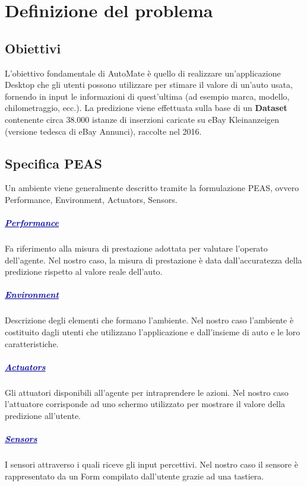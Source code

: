 \chapter{Definizione del problema}
\section{Obiettivi}
L'obiettivo fondamentale di AutoMate è quello di realizzare un'applicazione Desktop che gli utenti possono utilizzare per stimare il valore di un'auto usata, fornendo in input le informazioni di quest'ultima (ad esempio marca, modello, chilometraggio, ecc.). La predizione viene effettuata sulla base di un \textbf{Dataset} contenente circa 38.000 istanze di inserzioni caricate su eBay Kleinanzeigen (versione tedesca di eBay Annunci), raccolte nel 2016.
\medskip
\section{Specifica PEAS}
Un ambiente viene generalmente descritto tramite la formulazione PEAS, ovvero 
Performance, Environment, Actuators, Sensors.
\paragraph{\textcolor[HTML]{000099}{\underline{Performance}}} Fa riferimento alla misura di prestazione adottata per valutare l'operato dell'agente. Nel nostro caso, la misura di prestazione è data dall'accuratezza della predizione rispetto al valore reale dell'auto.
\paragraph{\textcolor[HTML]{000099}{\underline{Environment}}} Descrizione degli elementi che formano l'ambiente. Nel nostro caso l'ambiente è costituito dagli utenti che utilizzano l'applicazione e dall'insieme di auto e le loro caratteristiche.
\paragraph{\textcolor[HTML]{000099}{\underline{Actuators}}} Gli attuatori disponibili all'agente per intraprendere le azioni. Nel nostro caso l'attuatore corrisponde ad uno schermo utilizzato per mostrare il valore della predizione all'utente.

\paragraph{\textcolor[HTML]{000099}{\underline{Sensors}}} I sensori attraverso i quali riceve gli input percettivi. Nel nostro caso il sensore è rappresentato da un Form compilato dall'utente grazie ad una tastiera.
